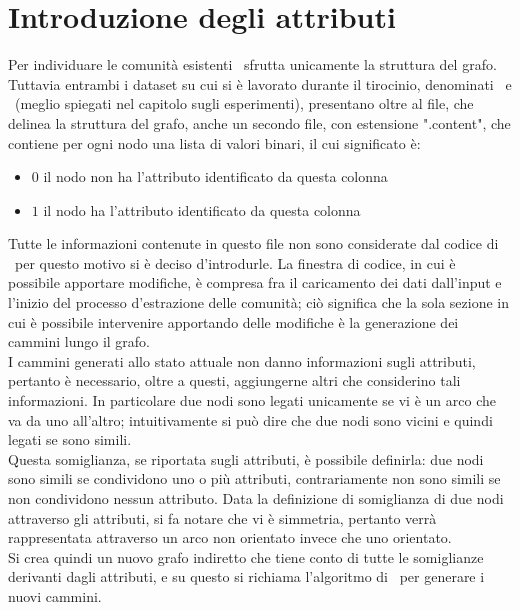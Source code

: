 \section{Introduzione degli attributi}
Per individuare le comunità esistenti \cnrl\ sfrutta unicamente la struttura del grafo.\\
Tuttavia entrambi i dataset su cui si è lavorato durante il tirocinio, denominati \cora\ e \citeseer\ (meglio spiegati nel capitolo sugli esperimenti), presentano oltre al file, che delinea la struttura del grafo, anche un secondo file, con estensione ".content", che contiene per ogni nodo una lista di valori binari, il cui significato è:
\begin{itemize}
	\item $0$ il nodo non ha l'attributo identificato da questa colonna
	\item $1$ il nodo ha l'attributo identificato da questa colonna
\end{itemize}
%
Tutte le informazioni contenute in questo file non sono considerate dal codice di \cnrl\ per questo motivo si è deciso d'introdurle. La finestra di codice, in cui è possibile apportare modifiche, è compresa fra il caricamento dei dati dall'input e l'inizio del processo d'estrazione delle comunità; ciò significa che la sola sezione in cui è possibile intervenire apportando delle modifiche è la generazione dei cammini lungo il grafo.\\
I cammini generati allo stato attuale non danno informazioni sugli attributi, pertanto è necessario, oltre a questi, aggiungerne altri che considerino tali informazioni. In particolare due nodi sono legati unicamente se vi è un arco che va da uno all'altro; intuitivamente si può dire che due nodi sono vicini e quindi legati se sono simili.\\
Questa somiglianza, se riportata sugli attributi, è possibile definirla: due nodi sono simili se condividono uno o più attributi, contrariamente non sono simili se non condividono nessun attributo. Data la definizione di somiglianza di due nodi attraverso gli attributi, si fa notare che vi è simmetria, pertanto verrà rappresentata attraverso un arco non orientato invece che uno orientato.\\
Si crea quindi un nuovo grafo indiretto che tiene conto di tutte le somiglianze derivanti dagli attributi, e su questo si richiama l'algoritmo di \nv\ per generare i nuovi cammini.
%
